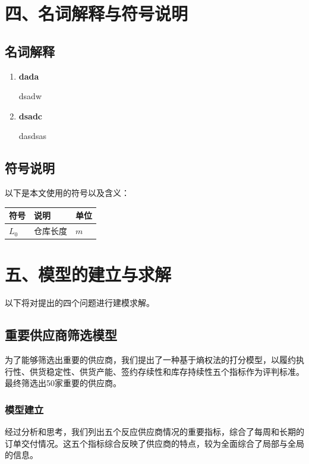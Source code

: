 \documentclass{my_paper}
\begin{document}
\section{四、名词解释与符号说明}
\subsection{名词解释}
\begin{enumerate}
    \item \textbf{dada}
    
    dsadw
    
    \item \textbf{dsadc}
    
    dasdsas

    
\end{enumerate}
\subsection{符号说明}
以下是本文使用的符号以及含义：
\begin{table}[h]%
    \centering
    \begin{tabular}{p{2.0cm}<{\centering}p{9.0cm}<{\centering}p{2.0cm}<{\centering}}
    \hline
    符号 & 说明 & 单位 \\ %
    \hline
    $L_0$ & 仓库长度 &  $m$\\
    
    \hline
    \end{tabular}
\end{table}

\section{五、模型的建立与求解}

以下将对提出的四个问题进行建模求解。

\subsection{重要供应商筛选模型}
为了能够筛选出重要的供应商，我们提出了一种基于熵权法的打分模型，以履约执行性、供货稳定性、供货产能、签约存续性和库存持续性五个指标作为评判标准。最终筛选出50家重要的供应商。
\subsubsection{模型建立}
经过分析和思考，我们列出五个反应供应商情况的重要指标，综合了每周和长期的订单交付情况。这五个指标综合反映了供应商的特点，较为全面综合了局部与全局的信息。
\end{document}
